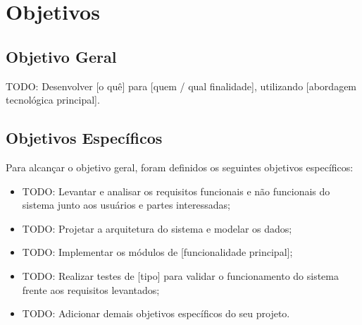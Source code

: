 \section{Objetivos}
\label{sec:objetivos}

\subsection{Objetivo Geral}
\label{subsec:objetivo-geral}

TODO: Desenvolver [o quê] para [quem / qual finalidade], utilizando
[abordagem tecnológica principal].


\subsection{Objetivos Específicos}
\label{subsec:objetivos-especificos}

Para alcançar o objetivo geral, foram definidos os seguintes objetivos
específicos:

\begin{itemize}
  \item TODO: Levantar e analisar os requisitos funcionais e não funcionais
        do sistema junto aos usuários e partes interessadas;
  \item TODO: Projetar a arquitetura do sistema e modelar os dados;
  \item TODO: Implementar os módulos de [funcionalidade principal];
  \item TODO: Realizar testes de [tipo] para validar o funcionamento do
        sistema frente aos requisitos levantados;
  \item TODO: Adicionar demais objetivos específicos do seu projeto.
\end{itemize}


